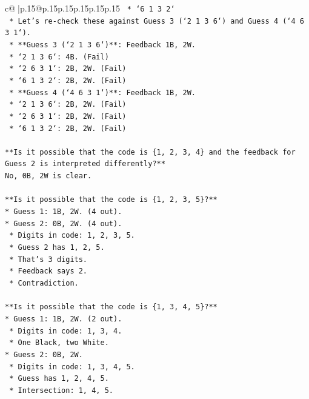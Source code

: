 \documentclass{article}
\begin{document}
{\begin{supertabular}{c@{$\;$}|p{.15\linewidth}@{}p{.15\linewidth}p{.15\linewidth}p{.15\linewidth}p{.15\linewidth}p{.15\linewidth}}
{{{\texttt{        *   `6 1 3 2`} \\
\texttt{    *   Let's re{-}check these against Guess 3 (`2 1 3 6`) and Guess 4 (`4 6 3 1`).} \\
\texttt{    *   **Guess 3 (`2 1 3 6`)**: Feedback 1B, 2W.} \\
\texttt{        *   `2 1 3 6`: 4B. (Fail)} \\
\texttt{        *   `2 6 3 1`: 2B, 2W. (Fail)} \\
\texttt{        *   `6 1 3 2`: 2B, 2W. (Fail)} \\
\texttt{    *   **Guess 4 (`4 6 3 1`)**: Feedback 1B, 2W.} \\
\texttt{        *   `2 1 3 6`: 2B, 2W. (Fail)} \\
\texttt{        *   `2 6 3 1`: 2B, 2W. (Fail)} \\
\texttt{        *   `6 1 3 2`: 2B, 2W. (Fail)} \\
\\ 
\texttt{**Is it possible that the code is \{1, 2, 3, 4\} and the feedback for Guess 2 is interpreted differently?**} \\
\texttt{No, 0B, 2W is clear.} \\
\\ 
\texttt{**Is it possible that the code is \{1, 2, 3, 5\}?**} \\
\texttt{*   Guess 1: 1B, 2W. (4 out).} \\
\texttt{*   Guess 2: 0B, 2W. (4 out).} \\
\texttt{    *   Digits in code: 1, 2, 3, 5.} \\
\texttt{    *   Guess 2 has 1, 2, 5.} \\
\texttt{    *   That's 3 digits.} \\
\texttt{    *   Feedback says 2.} \\
\texttt{    *   Contradiction.} \\
\\ 
\texttt{**Is it possible that the code is \{1, 3, 4, 5\}?**} \\
\texttt{*   Guess 1: 1B, 2W. (2 out).} \\
\texttt{    *   Digits in code: 1, 3, 4.} \\
\texttt{    *   One Black, two White.} \\
\texttt{*   Guess 2: 0B, 2W.} \\
\texttt{    *   Digits in code: 1, 3, 4, 5.} \\
\texttt{    *   Guess has 1, 2, 4, 5.} \\
\texttt{    *   Intersection: 1, 4, 5.} \\
}}}
\end{supertabular}}
\end{document}
